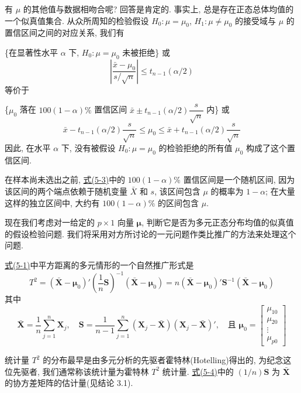 
有 $\mu$ 的其他值与数据相吻合呢? 回答是肯定的. 事实上, 总是存在正态总体均值的一个似真值集合. 从众所周知的检验假设 $H_0: \mu = \mu_0$, $H_1: \mu \neq \mu_0$ 的接受域与 $\mu$ 的置信区间之间的对应关系, 我们有

\{在显著性水平 $\alpha$ 下, $H_0: \mu = \mu_0$ 未被拒绝\} 或
\[
\left|\frac{\bar{x} - \mu_0}{s/\sqrt{n}}\right| \leq t_{n-1}(\alpha/2)
\]
等价于

\{$\mu_0$ 落在 $100(1-\alpha)\%$ 置信区间 $\bar{x} \pm t_{n-1}(\alpha/2)\dfrac{s}{\sqrt{n}}$ 内\} 或
\label{eq:5-3}
\begin{equation}
\bar{x} - t_{n-1}(\alpha/2)\frac{s}{\sqrt{n}} \leq \mu_0 \leq \bar{x} + t_{n-1}(\alpha/2)\frac{s}{\sqrt{n}} \tag{5-3}
\end{equation}
因此, 在水平 $\alpha$ 下, 没有被假设 $H_0: \mu = \mu_0$ 的检验拒绝的所有值 $\mu_0$ 构成了这个置信区间.

在样本尚未选出之前, \hyperref[eq:5-3]{式(5-3)}中的 $100(1-\alpha)\%$ 置信区间是一个随机区间, 因为该区间的两个端点依赖于随机变量 $\bar{X}$ 和 $s$, 该区间包含 $\mu$ 的概率为 $1-\alpha$; 在大量这样的独立区间中, 大约有 $100(1-\alpha)\%$ 的区间包含 $\mu$.

现在我们考虑对一给定的 $p \times 1$ 向量 $\boldsymbol{\mu}$, 判断它是否为多元正态分布均值的似真值的假设检验问题. 我们将采用对方所讨论的一元问题作类比推广的方法来处理这个问题.

\hyperref[eq:5-1]{式(5-1)}中平方距离的多元情形的一个自然推广形式是
\label{eq:5-4}
\begin{equation}
T^2 = (\bar{\mathbf{X}} - \boldsymbol{\mu}_0)'\left(\frac{1}{n}\mathbf{S}\right)^{-1}(\bar{\mathbf{X}} - \boldsymbol{\mu}_0) = n(\bar{\mathbf{X}} - \boldsymbol{\mu}_0)'\mathbf{S}^{-1}(\bar{\mathbf{X}} - \boldsymbol{\mu}_0) \tag{5-4}
\end{equation}
其中
\[
\bar{\mathbf{X}} = \frac{1}{n}\sum_{j=1}^{n}\mathbf{X}_j, \quad \mathbf{S} = \frac{1}{n-1}\sum_{j=1}^{n}(\mathbf{X}_j - \bar{\mathbf{X}})(\mathbf{X}_j - \bar{\mathbf{X}})', \quad \text{且 } \boldsymbol{\mu}_0 = \begin{bmatrix} \mu_{10} \\ \mu_{20} \\ \vdots \\ \mu_{p0} \end{bmatrix}
\]

统计量 $T^2$ 的分布最早是由多元分析的先驱者霍特林(Hotelling)得出的, 为纪念这位先驱者, 我们通常称该统计量为霍特林 $T^2$ 统计量. \hyperref[eq:5-4]{式(5-4)}中的 $(1/n)\mathbf{S}$ 为 $\bar{\mathbf{X}}$ 的协方差矩阵的估计量(见结论 3.1).

